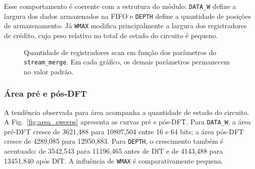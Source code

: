 \documentclass[conference]{IEEEtran}
\begin{document}
Esse comportamento é coerente com a estrutura do módulo: \texttt{DATA\_W} define a largura dos dados armazenados na FIFO e \texttt{DEPTH} define a quantidade de posições de armazenamento. Já \texttt{WMAX} modifica principalmente a largura dos registradores de crédito, cujo peso relativo no total de estado do circuito é pequeno.

\begin{figure}[!t]
\centering
{}
\caption{Quantidade de registradores scan em função dos parâmetros do \texttt{stream\_merge}. Em cada gráfico, os demais parâmetros permanecem no valor padrão.}
\label{fig:scan_sweeps}
\end{figure}

\subsubsection{Área pré e pós-DFT}

A tendência observada para área acompanha a quantidade de estado do circuito. A Fig.~\ref{fig:area_sweeps} apresenta as curvas pré e pós-DFT. Para \texttt{DATA\_W}, a área pré-DFT cresce de 3621,488 para 10807,504 entre 16 e 64 bits; a área pós-DFT cresce de 4289,085 para 12950,883. Para \texttt{DEPTH}, o crescimento também é acentuado: de 3542,543 para 11196,465 antes de DfT e de 4143,488 para 13451,840 após DfT. A influência de \texttt{WMAX} é comparativamente pequena.
\end{document}
